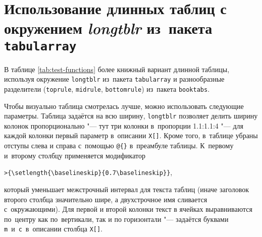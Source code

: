 \section{Использование длинных таблиц с окружением \textit{longtblr} из~пакета \texttt{tabularray}}\label{app:B2a}

В таблице \cref{tab:test-functions} более книжный вариант длинной таблицы,
используя окружение \verb!longtblr! из~пакета \verb!tabularray! и разнообразные
разделители (\verb!toprule!, \verb!midrule!, \verb!bottomrule!) из~пакета
\verb!booktabs!.

Чтобы визуально таблица смотрелась лучше, можно использовать следующие
параметры.
Таблица задаётся на всю ширину, \verb!longtblr! позволяет делить ширину колонок
пропорционально "--- тут три колонки в~пропорции 1.1:1.1:4 "--- для каждой
колонки первый параметр в~описании \verb!X[]!.
Кроме того, в~таблице убраны отступы слева и справа с~помощью \verb!@{}!
в~преамбуле таблицы.
К~первому и~второму столбцу применяется модификатор

\verb!>{\setlength{\baselineskip}{0.7\baselineskip}}!,

\noindent который уменьшает межстрочный интервал для текста таблиц (иначе
заголовок второго столбца значительно шире, а двухстрочное имя
сливается с~окружающими). Для первой и второй колонки текст в ячейках
выравниваются по~центру как по~вертикали, так и по горизонтали "---
задаётся буквами \verb!m!~и~\verb!c!~в~описании столбца \verb!X[]!.

